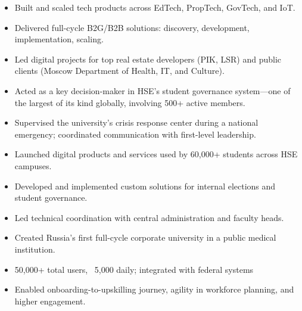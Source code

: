\documentclass[10pt,a4paper,ragged2e,withhyper]{altacv}
\begin{document}

\makecvheader

\begin{paracol}{2}


\begin{itemize}
  \item Built and scaled tech products across EdTech, PropTech, GovTech, and IoT.
  \item Delivered full-cycle B2G/B2B solutions: discovery, development, implementation, scaling.
  \item Led digital projects for top real estate developers (PIK, LSR) and public clients (Moscow Department of Health, IT, and Culture).
\end{itemize}

\divider

\begin{itemize}
  \item Acted as a key decision-maker in HSE's student governance system—one of the largest of its kind globally, involving 500+ active members.
  \item Supervised the university’s crisis response center during a national emergency; coordinated communication with first-level leadership.
  \item Launched digital products and services used by 60,000+ students across HSE campuses.
  \item Developed and implemented custom solutions for internal elections and student governance.
  \item Led technical coordination with central administration and faculty heads.
\end{itemize}


\begin{itemize}
  \item Created Russia’s first full-cycle corporate university in a public medical institution.
  \item 50,000+ total users, ~5,000 daily; integrated with federal systems
  \item Enabled onboarding-to-upskilling journey, agility in workforce planning, and higher engagement.
\end{itemize}


\end{paracol}
\end{document}
